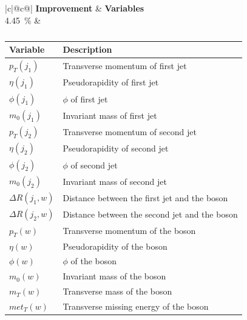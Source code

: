 \begin{table}[h]
    \centering
    \label{tab:app_vars_1}
    \caption{}
    \begin{tabular}{ |c|@{}c@{}| }
        \hline
        \textbf{Improvement} & \textbf{Variables}\\
        \hline
        \SI{4.45}{\%} & 
        \begin{tabular}{ll}
            \hline
            Variable & Description\\
            \hline
            $p_T(j_1)$ & Transverse momentum of first jet\\
            $\eta(j_1)$ & Pseudorapidity of first jet\\
            $\phi(j_1)$ & $\phi$ of first jet\\
            $m_0(j_1)$ & Invariant mass of first jet\\

            $p_T(j_2)$ & Transverse momentum of second jet\\
            $\eta(j_2)$ & Pseudorapidity of second jet\\
            $\phi(j_2)$ & $\phi$ of second jet\\
            $m_0(j_2)$ & Invariant mass of second jet\\

            $\Delta R(j_1, w)$ & Distance between the first jet and the \PWplus boson\\
            $\Delta R(j_2, w)$ & Distance between the second jet and the \PWplus boson\\

            $p_T(w)$ & Transverse momentum of the \PWplus boson\\
            $\eta(w)$ & Pseudorapidity of the \PWplus boson\\
            $\phi(w)$ & $\phi$ of the \PWplus boson\\
            $m_0(w)$ & Invariant mass of the \PWplus boson\\
            $m_T(w)$ & Transverse mass of the \PWplus boson\\
            $met_T(w)$ & Transverse missing energy of the \PWplus boson\\
            \hline
        \end{tabular}\\
        \hline
    \end{tabular}
\end{table}

